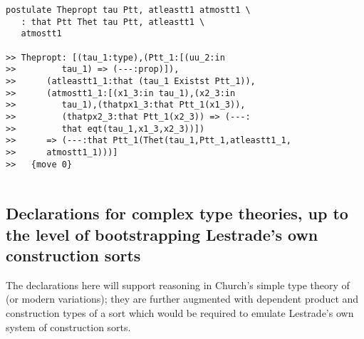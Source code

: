 \documentclass[12pt]{article}
\begin{document}
\begin{verbatim}
postulate Thepropt tau Ptt, atleastt1 atmostt1 \
   : that Ptt Thet tau Ptt, atleastt1 \
   atmostt1

>> Thepropt: [(tau_1:type),(Ptt_1:[(uu_2:in
>>         tau_1) => (---:prop)]),
>>      (atleastt1_1:that (tau_1 Existst Ptt_1)),
>>      (atmostt1_1:[(x1_3:in tau_1),(x2_3:in
>>         tau_1),(thatpx1_3:that Ptt_1(x1_3)),
>>         (thatpx2_3:that Ptt_1(x2_3)) => (---:
>>         that eqt(tau_1,x1_3,x2_3))])
>>      => (---:that Ptt_1(Thet(tau_1,Ptt_1,atleastt1_1,
>>      atmostt1_1)))]
>>   {move 0}


\end{verbatim}

\subsection{Declarations for complex type theories, up to the level of bootstrapping Lestrade's own construction sorts}

The declarations here will support reasoning in Church's simple type theory  of \cite{churchtypes} (or modern variations); they are further augmented with dependent product and construction types of a sort which would be required to emulate Lestrade's own system of construction sorts.
\end{document}
